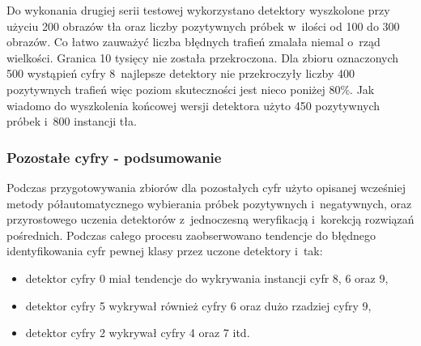 \begin{center}
\end{center}

Do wykonania drugiej serii testowej wykorzystano detektory
wyszkolone przy użyciu 200 obrazów tła oraz liczby pozytywnych 
próbek w~ilości od 100 do 300 obrazów. Co łatwo zauważyć liczba 
błędnych trafień zmalała niemal o~rząd wielkości. Granica 10 tysięcy
nie została przekroczona. Dla zbioru oznaczonych 500 wystąpień cyfry 
8~najlepsze detektory nie przekroczyły liczby 400 pozytywnych trafień
więc poziom skuteczności jest nieco poniżej 80\%. Jak wiadomo
do wyszkolenia końcowej wersji detektora użyto 450 pozytywnych próbek
i~800 instancji tła.

\subsubsection{Pozostałe cyfry - podsumowanie}

Podczas przygotowywania zbiorów dla pozostałych cyfr użyto 
opisanej wcześniej metody półautomatycznego wybierania próbek pozytywnych
i~negatywnych, oraz przyrostowego uczenia detektorów z~jednoczesną
weryfikacją i~korekcją rozwiązań pośrednich. Podczas całego
procesu zaobserwowano tendencje do błędnego identyfikowania cyfr pewnej
klasy przez uczone detektory i~tak:

\begin{itemize}
    \item detektor cyfry 0 miał tendencje do wykrywania instancji cyfr
        8, 6 oraz 9,
    \item detektor cyfry 5 wykrywał również cyfry 6 oraz dużo rzadziej
        cyfry 9,
    \item detektor cyfry 2 wykrywał cyfry 4 oraz 7 itd.
\end{itemize}

